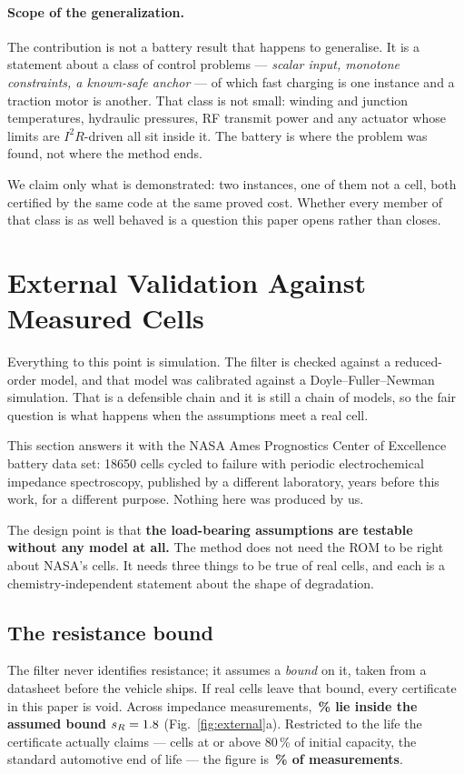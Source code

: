 \documentclass[11pt,letterpaper]{article}
\theoremstyle{definition}
\theoremstyle{remark}
\begin{document}
\paragraph{Scope of the generalization.} The contribution is not a battery result that happens to
generalise. It is a statement about a class of control problems --- \emph{scalar input, monotone
constraints, a known-safe anchor} --- of which fast charging is one instance and a traction
motor is another. That class is not small: winding and junction temperatures, hydraulic
pressures, RF transmit power and any actuator whose limits are $I^2R$-driven all sit inside it.
The battery is where the problem was found, not where the method ends.

We claim only what is demonstrated: two instances, one of them not a cell, both certified by the
same code at the same proved cost. Whether every member of that class is as well behaved is a
question this paper opens rather than closes.


\section{External Validation Against Measured Cells}\label{sec:external}

Everything to this point is simulation. The filter is checked against a reduced-order model,
and that model was calibrated against a Doyle--Fuller--Newman simulation. That is a defensible
chain and it is still a chain of models, so the fair question is what happens when the
assumptions meet a real cell.

This section answers it with the NASA Ames Prognostics Center of Excellence battery data set:
\nCells{} 18650 cells cycled to failure with periodic electrochemical impedance spectroscopy,
published by a different laboratory, years before this work, for a different purpose. Nothing
here was produced by us.

The design point is that \textbf{the load-bearing assumptions are testable without any model at
all.} The method does not need the ROM to be right about NASA's cells. It needs three things to
be true of real cells, and each is a chemistry-independent statement about the shape of
degradation.

\subsection{The resistance bound}

The filter never identifies resistance; it assumes a \emph{bound} on it, taken from a datasheet
before the vehicle ships. If real cells leave that bound, every certificate in this paper is
void. Across \nEIS{} impedance measurements, \textbf{\nInsideFrac\,\% lie inside the assumed
bound $s_R = 1.8$} (Fig.~\ref{fig:external}a). Restricted to the life the certificate
actually claims --- cells at or above 80\,\% of initial capacity, the standard automotive end of
life --- the figure is \textbf{\nInsideEolFrac\,\% of \nEolMeas{} measurements}.
\end{document}
